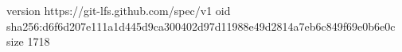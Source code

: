 version https://git-lfs.github.com/spec/v1
oid sha256:d6f6d207e111a1d445d9ca300402d97d11988e49d2814a7eb6c849f69e0b6e0c
size 1718
